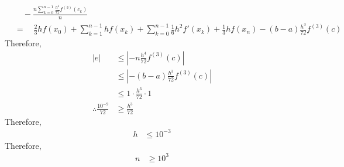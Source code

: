 \documentclass[fleqn, a4paper, 12pt, twoside]{article}
\theoremstyle{definition}
\theoremstyle{theorem}
\begin{document}
\begin{solution}
\begin{align*}
                                                & \quad - \frac{n \sum\limits_{k = 0}^{n - 1} \frac{h^4}{72} f^{(3)}(c_k)}{n}                                                                                                  \\
                                                & = \quad \frac{2}{3} h f(x_0) + \sum\limits_{k = 1}^{n - 1} h f(x_k) + \sum\limits_{k = 0}^{n - 1} \frac{1}{6} h^2 f'(x_k) + \frac{1}{3} h f(x_n) - (b - a) \frac{h^3}{72} f^{(3)}(c)
	\end{align*}
	Therefore,
	\begin{align*}
		|e|                           & \le \left| -n \frac{h^4}{72} f^{(3)}(c) \right| \\
                                              & \le \left| -(b - a) \frac{h^3}{72} f^{(3)}(c) \right|\\
                                              & \le 1 \cdot \frac{h^3}{72} \cdot 1              \\
		\therefore \frac{10^{-9}}{72} & \ge \frac{h^3}{72}
	\end{align*}
	Therefore,
	\begin{align*}
		h & \le 10^{-3}
	\end{align*}
	Therefore,
	\begin{align*}
		n & \ge 10^3
	\end{align*}
\end{solution}
\end{document}
